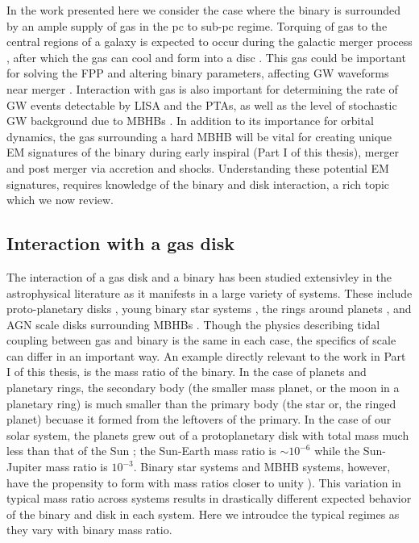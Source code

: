 In the work presented here we consider the case where the binary is surrounded
by an ample supply of gas in the pc to sub-pc regime. Torquing of gas to the
central regions of a galaxy is expected to occur during the galactic merger
process \citep{BH1992, Barnes:1996}, after which the gas can cool and form into
a disc \citep{Barnes:2002}. This gas could be important for solving the FPP
and altering binary parameters, affecting GW waveforms near merger
\citep[\emph{e.g.}][]{ArmNat:2005, YKH:2011:L, RoedigSesana:2012:eccGWs}.
Interaction with gas is also important for determining the rate of GW events
detectable by LISA and the PTAs, as well as the level of stochastic GW
background due to MBHBs \citep{KocsisSesans:2011, Shannon:2015,
Sesana+2016:GWB, PTAsGWB}. In addition to its importance for orbital dynamics,
the gas surrounding a hard MBHB will be vital for creating unique EM
signatures of the binary during early inspiral (Part I of this thesis), merger
\citep{Chang:2010, Baruteau:2012, CerioliLodato:Squeeze:2016} and post merger
\citep{Lippai:2008, Lia10, Ponce:2012, } via accretion and shocks. Understanding these potential EM signatures, requires knowledge of the binary and disk interaction, a rich topic which we now review.




\subsection{Interaction with a gas disk}  
The interaction of a gas disk and a binary has been studied extensivley in the
astrophysical literature as it manifests in a large variety of systems. These
include proto-planetary disks \citep{}, young binary star systems \citep{},
the rings around planets \citep{GTSaturn78}, and AGN scale disks surrounding
MBHBs \citep{}. Though the physics describing tidal coupling between gas and
binary is the same in each case, the specifics of scale can differ in an
important way.  An example directly relevant to the work in Part I of this
thesis, is the mass ratio of the binary. In the case of planets and planetary
rings, the secondary body (the smaller mass planet, or the moon in a planetary
ring) is much smaller than the primary body (the star or, the ringed planet)
becuase it formed from the leftovers of the primary. In the case of our solar
system, the planets grew out of a protoplanetary disk with total mass much
less than that of the Sun \citep{}; the Sun-Earth mass ratio is $\sim10^{-6}$
while the Sun-Jupiter mass ratio is $10^{-3}$. Binary star systems and MBHB
systems, however, have the propensity to form with mass ratios closer to unity
\citep[for MBHBs see previous section, for stars see][]{StellMassRatDist:2015}). This variation in typical mass ratio across
systems results in drastically different expected behavior of the binary and
disk in each system. Here we introudce the typical regimes as they vary with
binary mass ratio.

